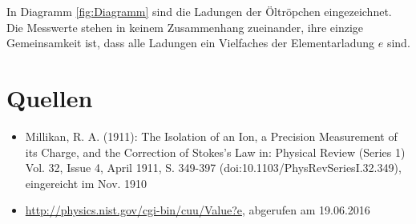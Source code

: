 \documentclass[a4paper,12pt,fleqn,oneside]{article}
\begin{document}
	In Diagramm \ref{fig:Diagramm} sind die Ladungen der Öltröpchen eingezeichnet. Die Messwerte stehen in keinem Zusammenhang
	zueinander, ihre einzige Gemeinsamkeit ist, dass alle Ladungen ein Vielfaches der Elementarladung $e$ sind.
\newpage


\section{Quellen}
	\begin{itemize}
		\item Millikan, R. A. (1911): The Isolation of an Ion, a Precision Measurement of its Charge, and the Correction of Stokes's
			 Law in: Physical Review (Series 1) Vol. 32, Issue 4, April 1911, S. 349-397 (doi:10.1103/PhysRevSeriesI.32.349),
			 eingereicht im Nov. 1910
		\item \url{http://physics.nist.gov/cgi-bin/cuu/Value?e}, abgerufen am 19.06.2016
	\end{itemize}
\end{document}
